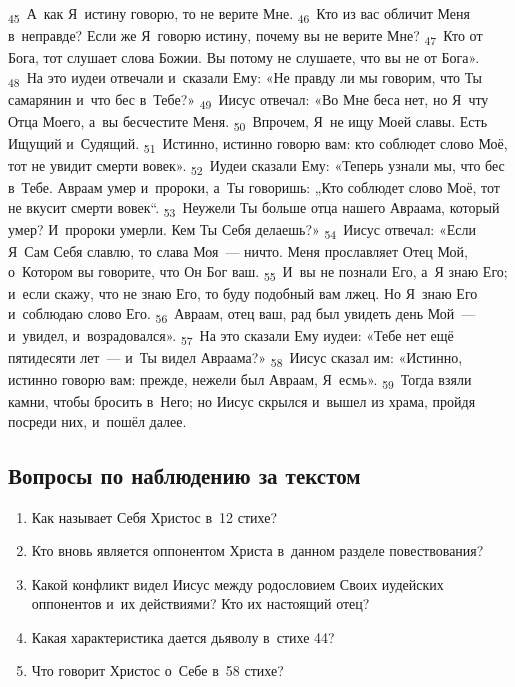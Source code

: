 \documentclass[a4paper,12pt]{article}
\begin{document}
\textsubscript{45}~А~как Я~истину говорю, то не верите Мне.
\textsubscript{46}~Кто из вас обличит Меня в~неправде? Если же Я~говорю истину, почему вы не верите Мне?
\textsubscript{47}~Кто от Бога, тот слушает слова Божии. Вы потому не слушаете, что вы не от Бога».
\textsubscript{48}~На это иудеи отвечали и~сказали Ему: «Не правду ли мы говорим, что Ты самарянин и~что бес в~Тебе?»
\textsubscript{49}~Иисус отвечал: «Во Мне беса нет, но Я~чту Отца Моего, а~вы бесчестите Меня.
\textsubscript{50}~Впрочем, Я~не ищу Моей славы. Есть Ищущий и~Судящий.
\textsubscript{51}~Истинно, истинно говорю вам: кто соблюдет слово Моё, тот не увидит смерти вовек».
\textsubscript{52}~Иудеи сказали Ему: «Теперь узнали мы, что бес в~Тебе. Авраам умер и~пророки, а~Ты говоришь: „Кто соблюдет слово Моё, тот не вкусит смерти вовек“.
\textsubscript{53}~Неужели Ты больше отца нашего Авраама, который умер? И~пророки умерли. Кем Ты Себя делаешь?»
\textsubscript{54}~Иисус отвечал: «Если Я~Сам Себя славлю, то слава Моя~--- ничто. Меня прославляет Отец Мой, о~Котором вы говорите, что Он Бог ваш.
\textsubscript{55}~И~вы не познали Его, а~Я знаю Его; и~если скажу, что не знаю Его, то буду подобный вам лжец. Но Я~знаю Его и~соблюдаю слово Его.
\textsubscript{56}~Авраам, отец ваш, рад был увидеть день Мой~--- и~увидел, и~возрадовался».
\textsubscript{57}~На это сказали Ему иудеи: «Тебе нет ещё пятидесяти лет~--- и~Ты видел Авраама?»
\textsubscript{58}~Иисус сказал им: «Истинно, истинно говорю вам: прежде, нежели был Авраам, Я~есмь».
\textsubscript{59}~Тогда взяли камни, чтобы бросить в~Него; но Иисус скрылся и~вышел из храма, пройдя посреди них, и~пошёл далее. 

\subsection*{Вопросы по наблюдению за текстом}
\begin{enumerate}
    \item Как называет Себя Христос в~12 стихе? 
    
    \myline
    
    \item Кто вновь является оппонентом Христа в~данном разделе повествования? 
    
    \myline
    
    \item Какой конфликт видел Иисус между родословием Своих иудейских оппонентов и~их действиями? Кто их настоящий отец? 
    
    \myline
    
    \myline
    \item Какая характеристика дается дьяволу в~стихе 44? 
    
    \myline
    
    \myline
    \item Что говорит Христос о~Себе в~58 стихе? 
    
    \myline
    
    \myline
\end{enumerate}
\end{document}
